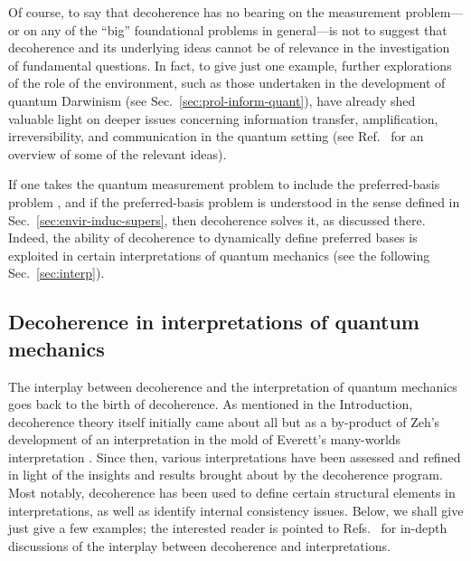 \documentclass[3p,sort&compress,12pt]{elsarticle}
\begin{document}
Of course, to say that decoherence has no bearing on the measurement problem---or on any of the ``big'' foundational problems in general---is not to suggest that decoherence and its underlying ideas cannot be of relevance in the investigation of fundamental questions. In fact, to give just one example, further explorations of the role of the environment, such as those undertaken in the development of quantum Darwinism (see Sec.~\ref{sec:prol-inform-quant}), have already shed valuable light on deeper issues concerning information transfer, amplification, irreversibility, and communication in the quantum setting \cite{Zurek:2003:pl,Ollivier:2003:za,Ollivier:2004:im,Blume:2004:oo,Blume:2005:oo,Zurek:2009:om,Riedel:2010:un,Riedel:2011:un,Riedel:2012:un,Streltsov:2013:oo,Zurek:2013:xx,Zurek:2018:om,Zurek:2018:on} (see Ref.~\cite{Zurek:2009:om} for an overview of some of the relevant ideas).
 
If one takes the quantum measurement problem to include the preferred-basis problem \cite{Schlosshauer:2007:un}, and if the preferred-basis problem is understood in the sense defined in Sec.~\ref{sec:envir-induc-supers}, then decoherence solves it, as discussed there. Indeed, the ability of decoherence to dynamically define preferred bases is exploited in certain interpretations of quantum mechanics (see the following Sec.~\ref{sec:interp}). 

\subsection{Decoherence in interpretations of quantum mechanics\label{sec:interp}}

The interplay between decoherence and the interpretation of quantum mechanics goes back to the birth of decoherence. As mentioned in the Introduction, decoherence theory itself initially came about all but as a by-product of Zeh's development of an interpretation in the mold of Everett's many-worlds interpretation \cite{Zeh:1970:yt}. Since then, various interpretations have been assessed and refined in light of the insights and results brought about by the decoherence program. Most notably, decoherence has been used to define certain structural elements in interpretations, as well as identify internal consistency issues. Below, we shall give just give a few examples; the interested reader is pointed to Refs.~\cite{Schlosshauer:2003:tv, Bacciagaluppi:2003:yz} for in-depth discussions of the interplay between decoherence and interpretations. 
\end{document}

